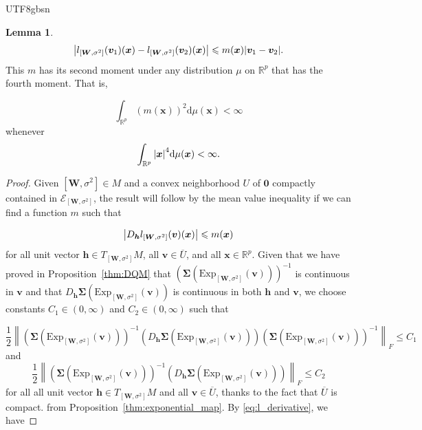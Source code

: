 \documentclass[12pt]{report}
\newcommand{\bracket}[1]{\left ( #1 \right )}
\theoremstyle{plain}
\theoremstyle{definition}
\newtheorem{lemma}[theorem]{Lemma}
\begin{document}
\begin{CJK*}{UTF8}{gbsn}
\begin{lemma}
\begin{equation*}
  \abs{l_{[\bm{W}, \sigma^2]}(\bm{v}_1)(\bm{x})-
  l_{[\bm{W}, \sigma^2]}(\bm{v}_2)(\bm{x})} 
  \leqslant m(\bm{x}) \abs{\bm{v}_1-\bm{v}_2}.
\end{equation*}
This $m$ has its second moment 
under any distribution $\mu$ on $\mathbb{R}^p$ that 
has the fourth moment.
That is,

\begin{equation*}
  \int_{\mathbb{R}^p} (m(\bm{x}))^2 \mathrm{d} \mu(\bm{x}) < \infty
\end{equation*}
whenever 
\begin{equation*}
  \int_{\mathbb{R}^p} \abs{\bm{x}}^4 \mathrm{d} \mu(\bm{x}) < \infty.
\end{equation*}
\end{lemma}
\begin{proof}
Given $[\bm{W}, \sigma^2] \in M$
and a convex neighborhood $U$ of $\bm{0}$ 
compactly contained in $\mathcal{E}_{[\bm{W}, \sigma^2]}$,
the result will follow by the mean value inequality 
if we can find a function $m$ such that 

\begin{equation*}
  \abs{D_{\bm{h}}l_{[\bm{W}, \sigma^2]}(\bm{v})(\bm{x})} \leqslant m(\bm{x})
\end{equation*}
for all unit vector $\bm{h} \in T_{[\bm{W}, \sigma^2]}M$,
all $\bm{v} \in \overline{U}$,
and all $\bm{x} \in \mathbb{R}^p$.
Given that we have proved in Proposition~\ref{thm:DQM}
that $\bracket{\bm{\Sigma}(\text{Exp}_{[\bm{W},\sigma^2]}(\bm{v}))}^{-1}$
is continuous in $\bm{v}$ 
and that $D_{\bm{h}}\bm{\Sigma}(\text{Exp}_{[\bm{W},\sigma^2]}(\bm{v}))$
is continuous in both $\bm{h}$ and $\bm{v}$,
we choose constants $C_1 \in (0, \infty)$ and $C_2 \in (0, \infty)$
such that 

\begin{equation*}
  \frac{1}{2}\left \|\bracket{\bm{\Sigma}(\text{Exp}_{[\bm{W},\sigma^2]}(\bm{v}))}^{-1}
  \bracket{D_{\bm{h}}\bm{\Sigma}(\text{Exp}_{[\bm{W},\sigma^2]}(\bm{v}))}
  \bracket{\bm{\Sigma}(\text{Exp}_{[\bm{W},\sigma^2]}(\bm{v}))}^{-1} \right \|_F
  \leqslant C_1
\end{equation*}
and 
\begin{equation*}
  \frac{1}{2}\left \|\bracket{\bm{\Sigma}(\text{Exp}_{[\bm{W},\sigma^2]}(\bm{v}))}^{-1}
  \bracket{D_{\bm{h}}\bm{\Sigma}(\text{Exp}_{[\bm{W},\sigma^2]}(\bm{v}))} \right \|_F
  \leqslant C_2
\end{equation*}
for all all unit vector $\bm{h} \in T_{[\bm{W}, \sigma^2]}M$ and
all $\bm{v} \in \overline{U}$,
thanks to the fact that $\overline{U}$ is compact.
from Proposition~\ref{thm:exponential_map}.
By \eqref{eq:l_derivative},
we have 


\end{proof}
\end{CJK*}
\end{document}

